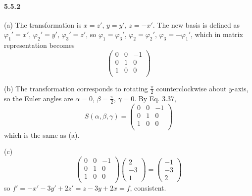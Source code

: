 \documentclass[a4paper]{article}
\begin{document}
\paragraph{5.5.2}
\renewcommand{\arraystretch}{1.0}
(a) The transformation is $x=z'$, $y=y'$, $z=-x'$. The new basis is defined as $\varphi_1'=x'$, $\varphi_2'=y'$, $\varphi_3'=z'$, so $\varphi_1=\varphi_3'$, $\varphi_2=\varphi_2'$, $\varphi_3=-\varphi_1'$, which in matrix representation becomes
\[
\begin{pmatrix}
0&0&-1\\
0&1&0\\
1&0&0\\
\end{pmatrix}
\]

(b) The transformation corresponds to rotating $\frac{\pi}{2}$ counterclockwise about $y$-axis, so the Euler angles are $\alpha=0$, $\beta=\frac{\pi}{2}$, $\gamma=0$. By Eq. 3.37, \[
S(\alpha,\beta,\gamma)=
\begin{pmatrix}
0&0&-1\\
0&1&0\\
1&0&0\\
\end{pmatrix}
\]
which is the same as (a).

(c) 
\[
\begin{pmatrix}
0&0&-1\\
0&1&0\\
1&0&0\\
\end{pmatrix}
\begin{pmatrix}
2\\-3\\1
\end{pmatrix}=
\begin{pmatrix}
-1\\-3\\2
\end{pmatrix}
\]
so $f'=-x'-3y'+2z'=z-3y+2x=f$, consistent.
\end{document}
